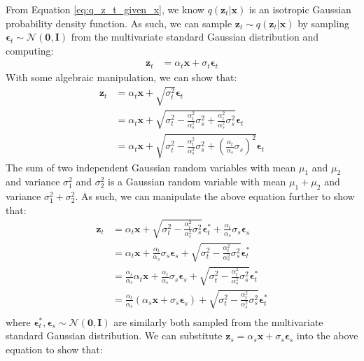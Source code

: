 \documentclass[ oneside,%
                    author={George Herbert},
                    degree={MSci},
                     title={Video Diffusion Models for Climate Simulations},
                  subtitle={}]{dissertation}
\begin{document}
From Equation \ref{eq:q_z_t_given_x}, we know $q(\mathbf{z}_t|\mathbf{x})$ is an isotropic Gaussian probability density function. As such, we can sample $\mathbf{z}_t\sim q(\mathbf{z}_t|\mathbf{x})$ by sampling $\boldsymbol\epsilon_t\sim\mathcal{N}(\mathbf{0}, \mathbf{I})$ from the multivariate standard Gaussian distribution and computing:
\begin{align}
      \mathbf{z}_t&=\alpha_t\mathbf{x}+\sigma_t\boldsymbol\epsilon_t\label{eq:z_t}
\end{align}
With some algebraic manipulation, we can show that:
\begin{align}
      \mathbf{z}_t&=\alpha_t\mathbf{x}+\sqrt{\sigma_t^2}\boldsymbol\epsilon_t\\
      &=\alpha_t\mathbf{x}+\sqrt{\sigma_t^2-\frac{\alpha_t^2}{\alpha_s^2}\sigma_s^2+\frac{\alpha_t^2}{\alpha_s^2}\sigma_s^2}\boldsymbol\epsilon_t\\
      &=\alpha_t\mathbf{x}+\sqrt{\sigma_t^2-\frac{\alpha_t^2}{\alpha_s^2}\sigma_s^2+\left(\frac{\alpha_t}{\alpha_s}\sigma_s\right)^2}\boldsymbol\epsilon_t
\end{align}
The sum of two independent Gaussian random variables with mean $\mu_1$ and $\mu_2$ and variance $\sigma_1^2$ and $\sigma_2^2$ is a Gaussian random variable with mean $\mu_1+\mu_2$ and variance $\sigma_1^2+\sigma_2^2$. As such, we can manipulate the above equation further to show that:
\begin{align}
      \mathbf{z}_t&=\alpha_t\mathbf{x}+\sqrt{\sigma_t^2-\frac{\alpha_t^2}{\alpha_s^2}\sigma_s^2}\boldsymbol\epsilon_t^*+\frac{\alpha_t}{\alpha_s}\sigma_s\boldsymbol\epsilon_s\\
      &=\alpha_t\mathbf{x}+\frac{\alpha_t}{\alpha_s}\sigma_s\boldsymbol\epsilon_s+\sqrt{\sigma_t^2-\frac{\alpha_t^2}{\alpha_s^2}\sigma_s^2}\boldsymbol\epsilon_t^*\\
      &=\frac{\alpha_s}{\alpha_s}\alpha_t\mathbf{x}+\frac{\alpha_t}{\alpha_s}\sigma_s\boldsymbol\epsilon_s+\sqrt{\sigma_t^2-\frac{\alpha_t^2}{\alpha_s^2}\sigma_s^2}\boldsymbol\epsilon_t^*\\
      &=\frac{\alpha_t}{\alpha_s}(\alpha_s\mathbf{x}+\sigma_s\boldsymbol\epsilon_s)+\sqrt{\sigma_t^2-\frac{\alpha_t^2}{\alpha_s^2}\sigma_s^2}\boldsymbol\epsilon_t^*\\
\end{align}
where $\boldsymbol\epsilon_t^*, \boldsymbol\epsilon_s\sim\mathcal{N}(\mathbf{0}, \mathbf{I})$ are similarly both sampled from the multivariate standard Gaussian distribution. We can substitute $\mathbf{z}_s=\alpha_s\mathbf{x}+\sigma_s\boldsymbol\epsilon_s$ into the above equation to show that:
\end{document}
